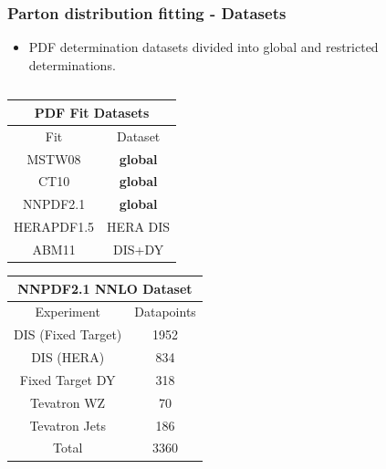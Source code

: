 \documentclass[10pt]{beamer}
\begin{document}
\begin{frame}
\frametitle{Parton distribution fitting - Datasets}

\begin{itemize}
\item<1-> \small PDF determination datasets divided into global and restricted determinations.
\end{itemize}

\begin{columns}

\begin{column}{0.3\textwidth}

\begin{table}
\tiny
\begin{tabular}{c|c}
\multicolumn{2}{c}{\bf PDF Fit Datasets}  \\
\hline 
  Fit & Dataset   \\
\hline 
MSTW08 & \textbf{global}  \\
CT10 & \textbf{global}  \\
NNPDF2.1 & \textbf{global}  \\
HERAPDF1.5 & HERA DIS \\
ABM11 & DIS+DY \\

\hline
\end{tabular}
\end{table}

\begin{table}
\tiny
\begin{tabular}{c|c}
\multicolumn{2}{c}{\bf NNPDF2.1 NNLO Dataset}  \\
\hline 
  Experiment & Datapoints   \\
\hline 
DIS (Fixed Target) & 1952  \\
DIS (HERA) & 834  \\
Fixed Target DY & 318  \\
Tevatron W\/Z & 70 \\
Tevatron Jets & 186 \\
\hline
Total   & 3360 \\

\hline
\end{tabular}
\end{table}


\end{column}


\end{columns}
\end{frame}
\end{document}
